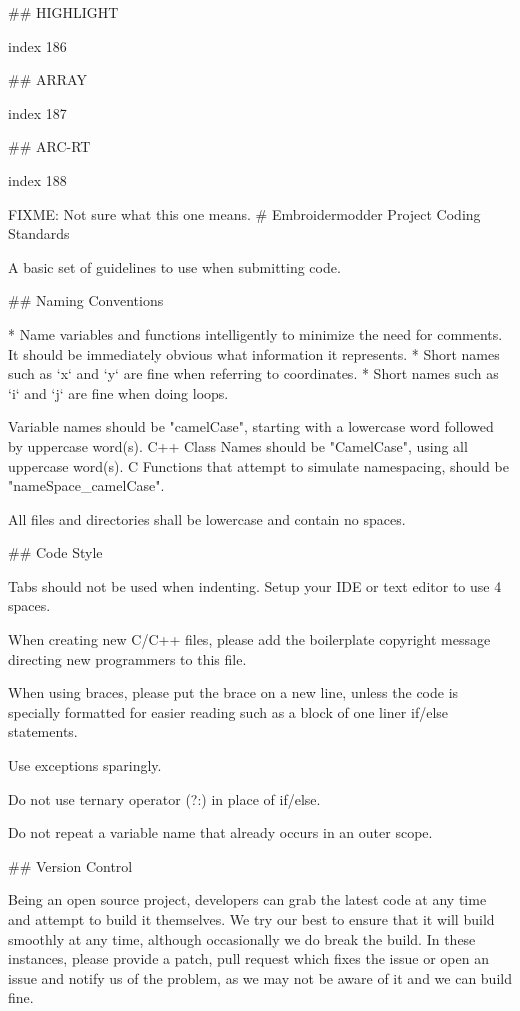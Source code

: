 ## HIGHLIGHT

index 186

## ARRAY

index 187

## ARC-RT

index 188

FIXME: Not sure what this one means.
# Embroidermodder Project Coding Standards

A basic set of guidelines to use when submitting code.

## Naming Conventions

* Name variables and functions intelligently to minimize the need for comments.
It should be immediately obvious what information it represents.
* Short names such as `x` and `y` are fine when referring to coordinates.
* Short names such as `i` and `j` are fine when doing loops.

Variable names should be "camelCase", starting with a lowercase word followed by uppercase word(s).
C++ Class Names should be "CamelCase", using all uppercase word(s).
C Functions that attempt to simulate namespacing, should be "nameSpace_camelCase".

All files and directories shall be lowercase and contain no spaces.

## Code Style

Tabs should not be used when indenting. Setup your IDE or text editor to use 4 spaces.

When creating new C/C++ files, please add the boilerplate copyright message directing
new programmers to this file.

When using braces, please put the brace on a new line, unless the code is specially formatted
for easier reading such as a block of one liner if/else statements.

Use exceptions sparingly.

Do not use ternary operator (?:) in place of if/else.

Do not repeat a variable name that already occurs in an outer scope.

## Version Control 

Being an open source project, developers can grab the latest code at any time
and attempt to build it themselves. We try our best to ensure that it will build smoothly
at any time, although occasionally we do break the build. In these instances,
please provide a patch, pull request which fixes the issue or open an issue and
notify us of the problem, as we may not be aware of it and we can build fine.

